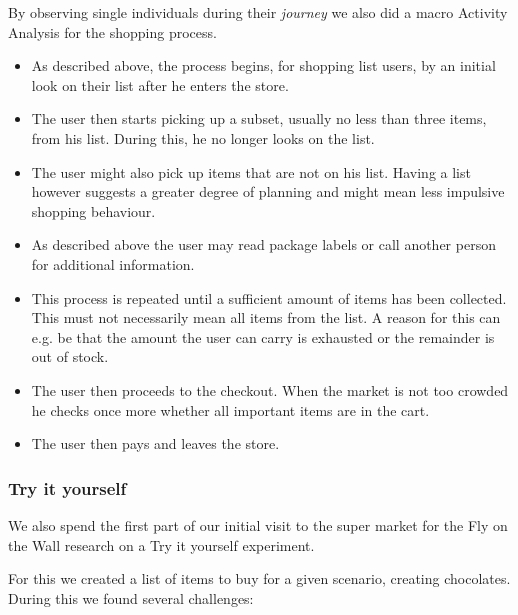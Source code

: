 \documentclass{scrartcl}
\begin{document}
      By observing single individuals during their \textit{journey} we also did a macro Activity Analysis for the shopping process.
      \begin{itemize}
        \item As described above, the process begins, for shopping list users, by an initial look on their list after he enters the store. 
        \item The user then starts picking up a subset, usually no less than three items, from his list. During this, he no longer looks on the list.
        \item The user might also pick up items that are not on his list. Having a list however suggests a greater degree of planning and might mean less impulsive shopping behaviour.
        \item As described above the user may read package labels or call another person for additional information.
        \item This process is repeated until a sufficient amount of items has been collected. 
          This must not necessarily mean all items from the list. A reason for this can e.g. be that the amount the user can carry is exhausted or the remainder is out of stock.
        \item The user then proceeds to the checkout. When the market is not too crowded he checks once more whether all important items are in the cart.
        \item The user then pays and leaves the store.
      \end{itemize}

    \subsubsection{Try it yourself}
      We also spend the first part of our initial visit to the super market for the Fly on the Wall research on a Try it yourself experiment.

      For this we created a list of items to buy for a given scenario, creating chocolates. 
      During this we found several challenges:
\end{document}
